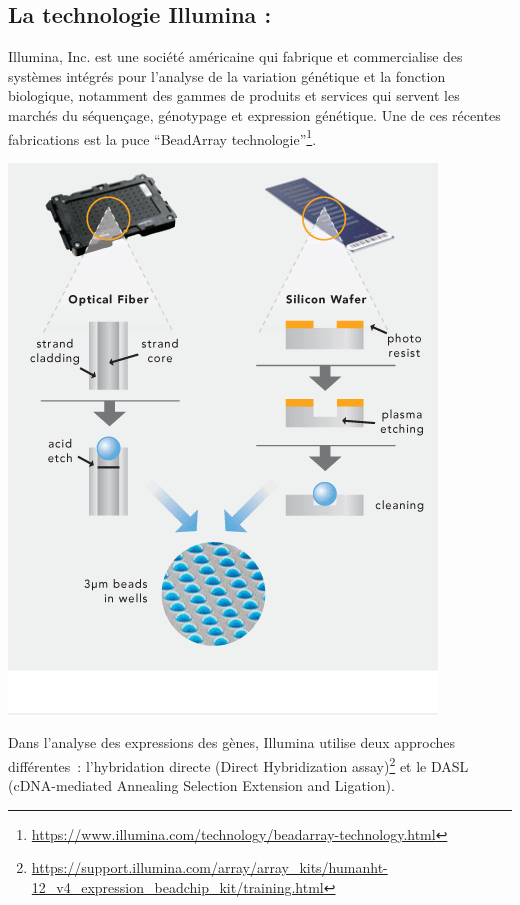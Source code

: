 \documentclass[a4paper,10pt]{article}
\begin{document}
\subsection{La technologie Illumina :}
Illumina, Inc. est une société américaine qui fabrique et commercialise des systèmes intégrés pour l'analyse de la variation génétique et la fonction biologique, 
notamment des gammes de produits et services qui servent les marchés du séquençage, génotypage et expression génétique.
\newline
Une de ces récentes fabrications est la puce ``BeadArray technologie''\footnote{\url{https://www.illumina.com/technology/beadarray-technology.html}}.
\begin{center}
 \includegraphics[scale=0.2]{./image/beadarray.png}
\end{center}
Dans l’analyse des expressions des gènes, Illumina utilise deux approches différentes : l’hybridation directe (Direct Hybridization assay)\footnote{\url{https://support.illumina.com/array/array\_kits/humanht-12\_v4\_expression\_beadchip\_kit/training.html}} et le DASL (cDNA-mediated Annealing Selection Extension and Ligation).
\end{document}
